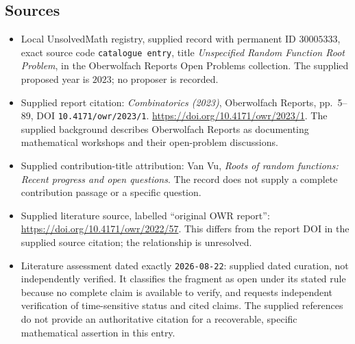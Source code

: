 \documentclass[11pt]{article}
\begin{document}
\subsection{Sources}
\begin{itemize}
\item Local UnsolvedMath registry, supplied record with permanent ID \(30005333\), exact source code \texttt{catalogue entry}, title \emph{Unspecified Random Function Root Problem}, in the Oberwolfach Reports Open Problems collection. The supplied proposed year is \(2023\); no proposer is recorded.
\item Supplied report citation: \emph{Combinatorics (2023)}, Oberwolfach Reports, pp.~5--89, DOI \texttt{10.4171/owr/2023/1}. \url{https://doi.org/10.4171/owr/2023/1}. The supplied background describes Oberwolfach Reports as documenting mathematical workshops and their open-problem discussions.
\item Supplied contribution-title attribution: Van Vu, \emph{Roots of random functions: Recent progress and open questions}. The record does not supply a complete contribution passage or a specific question.
\item Supplied literature source, labelled ``original OWR report'': \url{https://doi.org/10.4171/owr/2022/57}. This differs from the report DOI in the supplied source citation; the relationship is unresolved.
\item Literature assessment dated exactly \texttt{2026-08-22}: supplied dated curation, not independently verified. It classifies the fragment as open under its stated rule because no complete claim is available to verify, and requests independent verification of time-sensitive status and cited claims. The supplied references do not provide an authoritative citation for a recoverable, specific mathematical assertion in this entry.
\end{itemize}
\end{document}
